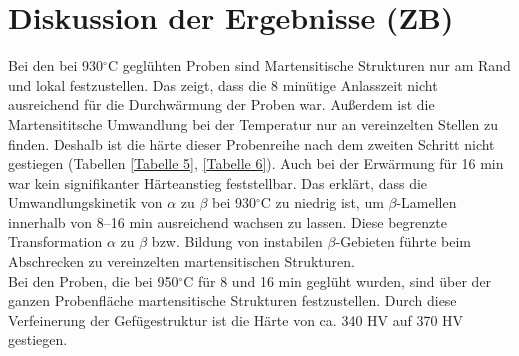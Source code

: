 \section{Diskussion der Ergebnisse (ZB)}

Bei den bei 930$^\circ$C geglühten Proben sind Martensitische Strukturen nur  am Rand und lokal festzustellen. Das zeigt, dass die 8 minütige Anlasszeit nicht ausreichend für die Durchwärmung der Proben war.
Außerdem ist die Martensititsche Umwandlung bei der Temperatur  nur an vereinzelten  Stellen zu finden. Deshalb ist die härte dieser Probenreihe nach dem zweiten Schritt nicht gestiegen (Tabellen \ref{Tabelle 5}, \ref{Tabelle 6}). Auch bei der Erwärmung für 16 min war kein signifikanter Härteanstieg feststellbar. Das erklärt, dass die Umwandlungskinetik von $\alpha$ zu $\beta$ bei 930$^\circ$C zu niedrig ist, um $\beta$-Lamellen innerhalb von 8--16 min ausreichend wachsen zu lassen. Diese begrenzte Transformation $\alpha$ zu $\beta$ bzw. Bildung von instabilen $\beta$-Gebieten führte beim Abschrecken zu vereinzelten martensitischen Strukturen.\\
Bei den Proben, die bei 950$^\circ$C für 8 und 16 min geglüht wurden, sind über der ganzen Probenfläche martensitische Strukturen festzustellen. Durch diese Verfeinerung der Gefügestruktur ist die Härte von ca. 340 HV auf 370 HV gestiegen. 

